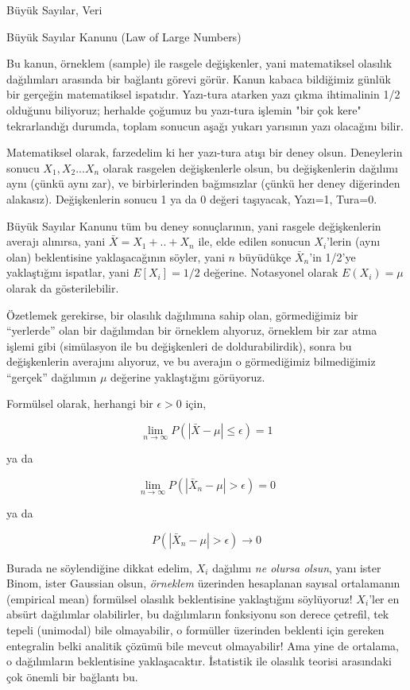 \documentclass[12pt,fleqn]{article}\usepackage{../../common}
\begin{document}
Büyük Sayılar, Veri

Büyük Sayılar Kanunu (Law of Large Numbers)

Bu kanun, örneklem (sample) ile rasgele değişkenler, yani matematiksel
olasılık dağılımları arasında bir bağlantı görevi görür. Kanun kabaca
bildiğimiz günlük bir gerçeğin matematiksel ispatıdır. Yazı-tura atarken
yazı çıkma ihtimalinin 1/2 olduğunu biliyoruz; herhalde çoğumuz bu
yazı-tura işlemin "bir çok kere" tekrarlandığı durumda, toplam sonucun
aşağı yukarı yarısının yazı olacağını bilir.

Matematiksel olarak, farzedelim ki her yazı-tura atışı bir deney
olsun. Deneylerin sonucu $X_1, X_2...X_n$ olarak rasgelen değişkenlerle
olsun, bu değişkenlerin dağılımı aynı (çünkü aynı zar), ve birbirlerinden
bağımsızlar (çünkü her deney diğerinden alakasız). Değişkenlerin sonucu 1
ya da 0 değeri taşıyacak, Yazı=1, Tura=0.

Büyük Sayılar Kanunu tüm bu deney sonuçlarının, yani rasgele değişkenlerin
averajı alınırsa, yani $\bar{X} = X_1 + .. + X_n$ ile, elde edilen sonucun
$X_i$'lerin (aynı olan) beklentisine yaklaşacağının söyler, yani $n$ büyüdükçe
$\bar{X}_n$'in 1/2'ye yaklaştığını ispatlar, yani $E[X_i] = 1/2$
değerine. Notasyonel olarak $E(X_i) = \mu$ olarak da gösterilebilir.

Özetlemek gerekirse, bir olasılık dağılımına sahip olan, görmediğimiz bir
``yerlerde'' olan bir dağılımdan bir örneklem alıyoruz, örneklem bir zar
atma işlemi gibi (simülasyon ile bu değişkenleri de doldurabilirdik), sonra
bu değişkenlerin averajını alıyoruz, ve bu averajın o görmediğimiz
bilmediğimiz ``gerçek'' dağılımın $\mu$ değerine yaklaştığını görüyoruz. 

Formülsel olarak, herhangi bir $\epsilon > 0$ için,

$$ \lim_{n \to \infty} P(|\bar{X} - \mu| \le \epsilon) = 1$$

ya da

 $$ \lim_{n \to \infty} P(|\bar{X}_n-\mu| > \epsilon) = 0 $$

ya da 

$$ P(|\bar{X}_n-\mu| > \epsilon) \rightarrow 0 $$

Burada ne söylendiğine dikkat edelim, $X_i$ dağılımı {\em ne olursa olsun}, yanı
ister Binom, ister Gaussian olsun, {\em örneklem} üzerinden hesaplanan sayısal
ortalamanın (empirical mean) formülsel olasılık beklentisine yaklaştığını
söylüyoruz! $X_i$'ler en absürt dağılımlar olabilirler, bu dağılımların
fonksiyonu son derece çetrefil, tek tepeli (unimodal) bile olmayabilir, o
formüller üzerinden beklenti için gereken entegralin belki analitik çözümü bile
mevcut olmayabilir! Ama yine de ortalama, o dağılımların beklentisine
yaklaşacaktır.  İstatistik ile olasılık teorisi arasındaki çok önemli bir
bağlantı bu.
\end{document}
